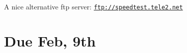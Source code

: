 A nice alternative ftp server\+: \href{ftp://speedtest.tele2.net}{\tt ftp\+://speedtest.\+tele2.\+net}

\section*{Due Feb, 9th}